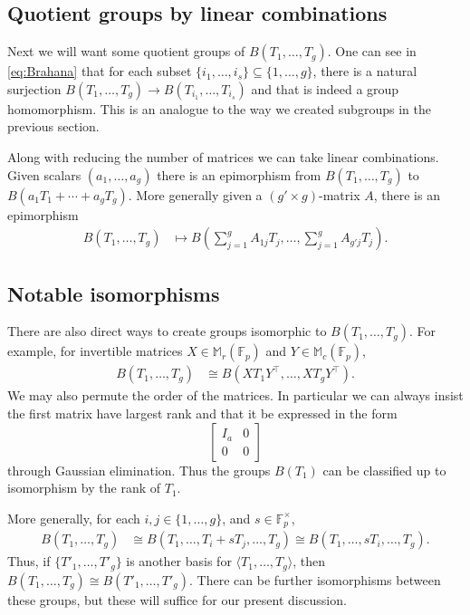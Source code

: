 \documentclass[11pt]{article}
\numberwithin{equation}{section}
\theoremstyle{definition}
\theoremstyle{plain}
\numberwithin{equation}{section}
\theoremstyle{plain}       %
\theoremstyle{remark}
\theoremstyle{definition}
\numberwithin{figure}{section}
\numberwithin{table}{section}
\newcommand{\bbF}{\mathbb{F}}  %
\begin{document}
\subsection{Quotient groups by linear combinations}\label{sec:sub-elim}
Next we will want some quotient groups of $B(T_1,\dots, T_g)$.  One can see in
\eqref{eq:Brahana} that for each subset $\{i_1,\dots,i_s\}\subseteq
\{1,\dots,g\}$, there is a natural surjection $B(T_1,\dots,T_g)\to
B(T_{i_1},\dots,T_{i_s})$ and that is indeed a group homomorphism.  This is an
analogue to the way we created subgroups in the previous section.  

Along with reducing the number of matrices we can take linear combinations.
Given scalars $(a_1,\dots,a_g)$ there is an epimorphism from $B(T_1,\dots,T_g)$
to $B(a_1T_1+\cdots +a_g T_g)$.  More generally given a $(g'\times g)$-matrix
$A$, there is an epimorphism
\begin{align*}
	B(T_1,\dots,T_g) & \mapsto B\left(\sum_{j=1}^g A_{1j}T_j,\dots, \sum_{j=1}^g A_{g'j} T_j\right).
\end{align*}


\subsection{Notable isomorphisms}
There are also direct ways to create groups isomorphic to $B(T_1,\dots,T_g)$.
For example, for invertible matrices $X\in\mathbb{M}_r(\bbF_p)$ and
$Y\in\mathbb{M}_c(\bbF_p)$,
\begin{align*}
	B(T_1,\dots,T_g)& \cong B(XT_1Y^{\top},\dots,XT_gY^{\top}).
\end{align*}
We may also permute the order of the matrices.  In particular we can always
insist the first matrix have largest rank and that it be expressed in the form
\[
  \left[\begin{matrix} I_a & 0 \\ 0 & 0 \end{matrix}\right]
\]
through Gaussian elimination.  Thus the groups $B(T_1)$ can be
classified up to isomorphism by the rank of $T_1$.

More generally, for each $i,j\in\{1,\dots,g\}$, and $s\in \bbF_p^{\times}$,
\begin{align*}
	B(T_1,\dots,T_g)& \cong B(T_1,\dots, T_i+s T_j,\dots,T_g) \cong B(T_1,\dots,sT_i,\dots,T_g).
\end{align*}
Thus, if  $\{T'_1,\dots,T'_g\}$ is another basis for $\langle
T_1,\dots,T_g\rangle$,  then $B(T_1,\dots,T_g)\cong B(T'_1,\dots,T'_g)$.  There
can be further isomorphisms between these groups, but these will suffice for our
present discussion.  
\medskip
\end{document}
